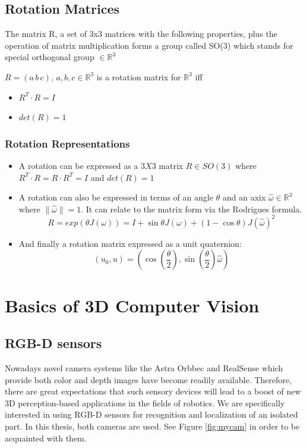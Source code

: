 \subsection{Rotation Matrices}
The matrix R, a set of 3x3 matrices with the following properties, plus the operation of matrix multiplication forms a group called SO(3) which stands for special orthogonal group $\in \mathbb{R}^{3} $

$R=(a\,  b\,  c), \, a,b,c \in \mathbb{R}^{3}$ is a rotation matrix for $\mathbb{R}^{3}$ iff
\begin{itemize}
\item $R^{T} \cdot R=I$
\item $det(R)=1$
\end{itemize}

\subsubsection{Rotation Representations}
\begin{itemize}
\item A rotation can be expressed as a $3X3$ matrix $R \in SO(3)$  where $R^{T} \cdot R= R \cdot R^{T} =I$ and $det(R)=1$

\item A rotation can also be expressed in terms of an angle $\theta$  and an axix $\hat{\omega} \in \mathbb{R}^{3}$ where $\|\hat{\omega}\|=1$. It can relate to the matrix form via the Rodrigues formula.
$$R=exp(\theta J(\omega))=I+\sin \theta J(\omega)+(1-\cos \theta)J(\hat{\omega})^{2}$$

\item And finally a rotation matrix expressed as a unit quaternion:
$$(u_{0},u)=(\cos(\frac{\theta}{2}),\sin(\frac{\theta}{2})\hat{\omega})$$
\end{itemize}


\section{Basics of 3D Computer Vision}
\subsection{ RGB-D sensors} \label{rgbdcamera}
Nowadays novel camera systems like the Astra Orbbec and RealSense which provide both color and depth images have become readily available. Therefore, there are great expectations that such sensory devices will lead to a boost of new 3D perception-based applications in the fields of robotics. We are specifically interested in using RGB-D sensors for recognition and localization of an isolated part. In this thesis, both cameras are used. See Figure \ref{fig:mycam} in order to be acquainted with them.

